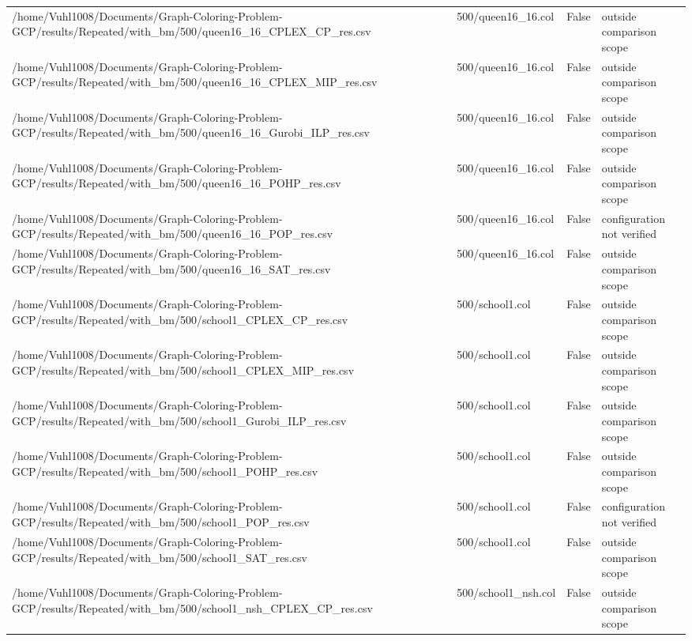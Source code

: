 \begin{table}[htbp]
\begin{tabular}{llll}
/home/Vuhl1008/Documents/Graph-Coloring-Problem-GCP/results/Repeated/with\_bm/500/queen16\_16\_CPLEX\_CP\_res.csv & 500/queen16\_16.col & False & outside comparison scope \\
/home/Vuhl1008/Documents/Graph-Coloring-Problem-GCP/results/Repeated/with\_bm/500/queen16\_16\_CPLEX\_MIP\_res.csv & 500/queen16\_16.col & False & outside comparison scope \\
/home/Vuhl1008/Documents/Graph-Coloring-Problem-GCP/results/Repeated/with\_bm/500/queen16\_16\_Gurobi\_ILP\_res.csv & 500/queen16\_16.col & False & outside comparison scope \\
/home/Vuhl1008/Documents/Graph-Coloring-Problem-GCP/results/Repeated/with\_bm/500/queen16\_16\_POHP\_res.csv & 500/queen16\_16.col & False & outside comparison scope \\
/home/Vuhl1008/Documents/Graph-Coloring-Problem-GCP/results/Repeated/with\_bm/500/queen16\_16\_POP\_res.csv & 500/queen16\_16.col & False & configuration not verified \\
/home/Vuhl1008/Documents/Graph-Coloring-Problem-GCP/results/Repeated/with\_bm/500/queen16\_16\_SAT\_res.csv & 500/queen16\_16.col & False & outside comparison scope \\
/home/Vuhl1008/Documents/Graph-Coloring-Problem-GCP/results/Repeated/with\_bm/500/school1\_CPLEX\_CP\_res.csv & 500/school1.col & False & outside comparison scope \\
/home/Vuhl1008/Documents/Graph-Coloring-Problem-GCP/results/Repeated/with\_bm/500/school1\_CPLEX\_MIP\_res.csv & 500/school1.col & False & outside comparison scope \\
/home/Vuhl1008/Documents/Graph-Coloring-Problem-GCP/results/Repeated/with\_bm/500/school1\_Gurobi\_ILP\_res.csv & 500/school1.col & False & outside comparison scope \\
/home/Vuhl1008/Documents/Graph-Coloring-Problem-GCP/results/Repeated/with\_bm/500/school1\_POHP\_res.csv & 500/school1.col & False & outside comparison scope \\
/home/Vuhl1008/Documents/Graph-Coloring-Problem-GCP/results/Repeated/with\_bm/500/school1\_POP\_res.csv & 500/school1.col & False & configuration not verified \\
/home/Vuhl1008/Documents/Graph-Coloring-Problem-GCP/results/Repeated/with\_bm/500/school1\_SAT\_res.csv & 500/school1.col & False & outside comparison scope \\
/home/Vuhl1008/Documents/Graph-Coloring-Problem-GCP/results/Repeated/with\_bm/500/school1\_nsh\_CPLEX\_CP\_res.csv & 500/school1\_nsh.col & False & outside comparison scope \\

\end{tabular}
\end{table}
